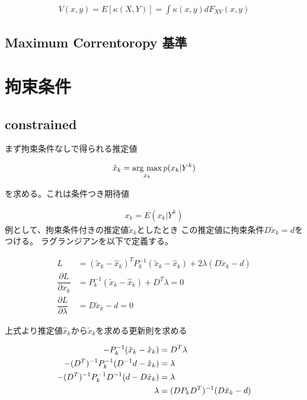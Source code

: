 \begin{align}
V(x,y)
=E[\kappa(X,Y)]
=\int \kappa(x,y) dF_{XY}(x,y)
\end{align}

\subsection{Maximum Correntoropy 基準}




\section{拘束条件}

\subsection{constrained}
まず拘束条件なしで得られる推定値

\begin{align}
\hat{x}_k
=
\mathop{\rm arg~max}\limits_{x_k} p(x_k|Y^k)
\end{align}

を求める。これは条件つき期待値

\begin{align}
x_k=E(x_k|Y^k)
\end{align}
例として、拘束条件付きの推定値$\tilde{x}_k$としたとき
この推定値に拘束条件$D\tilde{x}_k=d$をつける。
ラグランジアンを以下で定義する。

\begin{align}
L
&=
(\tilde{x}_k-\hat{x}_k)^T P_k^{-1} (\tilde{x}_k-\hat{x}_k)
+2\lambda(D\tilde{x}_k-d)												\\
%
\dfrac{\partial L}{\partial x_k}  
&=
P_k^{-1}(\tilde{x}_k-\hat{x}_k)+D^T\lambda = 0					\\
%
\dfrac{\partial L}{\partial \lambda}
&=
D\tilde{x}_k-d = 0
\end{align}

上式より推定値$\hat{x}_k$から$\tilde{x}_k$を求める更新則を求める

\begin{align}
-P_k^{-1}(\tilde{x}_k-\hat{x}_k) &= D^T\lambda  					\notag\\
-(D^T)^{-1}P_k^{-1}(D^{-1}d-\hat{x}_k) &= \lambda			\notag\\
-(D^T)^{-1}P_k^{-1}D^{-1}(d-D\hat{x}_k) &= \lambda		\notag\\
\lambda &=  (DP_k D^T)^{-1}(D\hat{x}_k-d)
\end{align}

